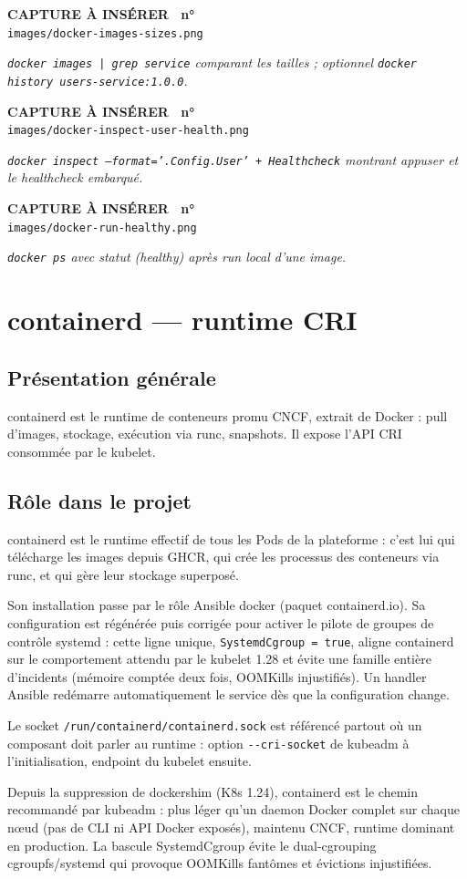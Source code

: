 \documentclass[12pt,a4paper]{article}
\newcounter{capturecount}
\newcommand{\capturebox}[2]{%
\par\vspace{4mm}
\begin{tcolorbox}[enhanced,colback=yellow!5,colframe=black!55,boxrule=0.7pt,
  borderline={0.7pt}{0pt}{black!40,dashed},
  arc=2mm,left=6pt,right=6pt,top=7pt,bottom=7pt]
\centering
{\normalsize\sffamily\bfseries CAPTURE À INSÉRER \textbar\ n°\,\stepcounter{capturecount}\thecapturecount}\\[3pt]
{\large\texttt{images/#2}}\\[7pt]
\begin{minipage}{0.94\linewidth}\centering\itshape #1\end{minipage}
\end{tcolorbox}
\par\vspace{2mm}}
\begin{document}
\capturebox{\texttt{docker images | grep service} comparant les tailles ; optionnel \texttt{docker history users-service:1.0.0}.}{docker-images-sizes.png}

\capturebox{\texttt{docker inspect --format='{{.Config.User}}' + Healthcheck} montrant appuser et le healthcheck embarqué.}{docker-inspect-user-health.png}

\capturebox{\texttt{docker ps} avec statut (healthy) après run local d'une image.}{docker-run-healthy.png}

\section{containerd --- runtime CRI}

\subsection{Présentation générale}
containerd est le runtime de conteneurs promu CNCF, extrait de Docker : pull d'images, stockage, exécution via runc, snapshots. Il expose l'API CRI consommée par le kubelet.

\subsection{Rôle dans le projet}
containerd est le runtime effectif de tous les Pods de la plateforme : c'est lui qui télécharge les images depuis GHCR, qui crée les processus des conteneurs via runc, et qui gère leur stockage superposé.

Son installation passe par le rôle Ansible docker (paquet containerd.io). Sa configuration est régénérée puis corrigée pour activer le pilote de groupes de contrôle systemd : cette ligne unique, \texttt{SystemdCgroup = true}, aligne containerd sur le comportement attendu par le kubelet 1.28 et évite une famille entière d'incidents (mémoire comptée deux fois, OOMKills injustifiés). Un handler Ansible redémarre automatiquement le service dès que la configuration change.

Le socket \texttt{/run/containerd/containerd.sock} est référencé partout où un composant doit parler au runtime : option \texttt{-{}-cri-socket} de kubeadm à l'initialisation, endpoint du kubelet ensuite.

\begin{whybox}
Depuis la suppression de dockershim (K8s 1.24), containerd est le chemin recommandé par kubeadm : plus léger qu'un daemon Docker complet sur chaque nœud (pas de CLI ni API Docker exposés), maintenu CNCF, runtime dominant en production. La bascule SystemdCgroup évite le dual-cgrouping cgroupfs/systemd qui provoque OOMKills fantômes et évictions injustifiées.
\end{whybox}
\end{document}
